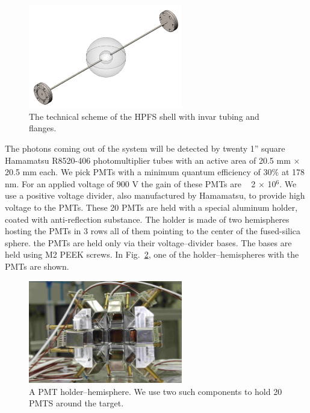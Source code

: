 \begin{figure}
   \centering
   \includegraphics[width=0.6\textwidth]{sphere.png}
   \caption{The technical scheme of the HPFS shell with invar tubing and flanges.} 
   \label{fig:sphere}
\end{figure}


The photons coming out of the system will be detected by twenty 1'' square Hamamatsu R8520-406 photomultiplier 
tubes with an active area of 20.5 mm $\times$ 20.5 mm each. We pick PMTs with a minimum quantum efficiency of 30\% 
at 178 nm. For an applied voltage of 900 V the gain of these PMTs are ~ 2 $\times$ 10$^6$. We use a positive 
voltage divider, also manufactured by Hamamatsu, to provide high voltage to the PMTs.
These 20 PMTs are held with a special aluminum holder, coated with anti-reflection substance. The holder is made of two hemispheres hosting the PMTs in 
3 rows all of them pointing to the center of the fused-silica sphere. the PMTs are held only via their voltage--divider bases. The bases are held using M2 PEEK screws. 
In Fig.~\ref{fig:pmtholder}, one of the holder--hemispheres with the PMTs are shown.

\begin{figure}
   \centering
   \includegraphics[width=0.6\textwidth]{PMTholder.JPG}
   \caption{A PMT holder--hemisphere. We use two such components to hold 20 PMTS around the target.} 
   \label{fig:pmtholder}
\end{figure}


